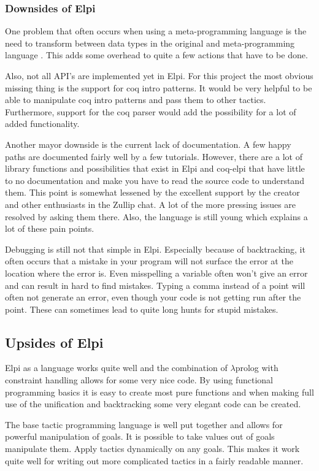 \documentclass[thesis.tex]{subfiles}
\begin{document}
{{{\subsubsection*{Downsides of Elpi}
One problem that often occurs when using a meta-programming language is the need to transform between data types in the original and meta-programming language \cite*{}. This adds some overhead to quite a few actions that have to be done.

Also, not all API's are implemented yet in Elpi. For this project the most obvious missing thing is the support for coq intro patterns. It would be very helpful to be able to manipulate coq intro patterns and pass them to other tactics. Furthermore, support for the coq parser would add the possibility for a lot of added functionality.

Another mayor downside is the current lack of documentation. A few happy paths are documented fairly well by a few tutorials. However, there are a lot of library functions and possibilities that exist in Elpi and coq-elpi that have little to no documentation and make you have to read the source code to understand them. This point is somewhat lessened by the excellent support by the creator and other enthusiasts in the Zullip chat. A lot of the more pressing issues are resolved by asking them there. Also, the language is still young which explains a lot of these pain points.

Debugging is still not that simple in Elpi. Especially because of backtracking, it often occurs that a mistake in your program will not surface the error at the location where the error is. Even misspelling a variable often won't give an error and can result in hard to find mistakes. Typing a comma instead of a point will often not generate an error, even though your code is not getting run after the point. These can sometimes lead to quite long hunts for stupid mistakes.

\subsection*{Upsides of Elpi}
Elpi as a language works quite well and the combination of $\lambda$prolog with constraint handling allows for some very nice code. By using functional programming basics it is easy to create most pure functions and when making full use of the unification and backtracking some very elegant code can be created.

The base tactic programming language is well put together and allows for powerful manipulation of goals. It is possible to take values out of goals manipulate them. Apply tactics dynamically on any goals. This makes it work quite well for writing out more complicated tactics in a fairly readable manner.

}}}
\end{document}
